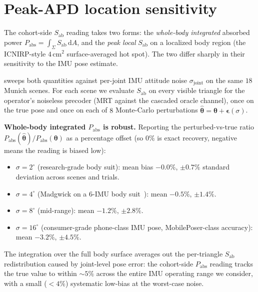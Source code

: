 \documentclass[10pt,journal,twocolumn]{IEEEtran}
\theoremstyle{plain}
\theoremstyle{definition}
\begin{document}
\section{Peak-APD location sensitivity}\label{si:peak-apd}

The cohort-side $S_\mathrm{ab}$ reading takes two forms: the
\emph{whole-body integrated} absorbed power $P_\mathrm{abs}
= \int_\Sigma S_\mathrm{ab}\,\mathrm{d}A$, and the \emph{peak local}
$S_\mathrm{ab}$ on a localized body region (the ICNIRP-style
$4\,$cm$^2$ surface-averaged hot spot). The two differ sharply in
their sensitivity to the IMU pose estimate.

 sweeps both quantities against per-joint
IMU attitude noise $\sigma_\mathrm{joint}$ on the same $18$
Munich scenes. For each scene we evaluate $S_\mathrm{ab}$ on
every visible triangle for the operator's noiseless precoder
(MRT against the cascaded oracle channel), once on the true
pose and once on each of $8$ Monte-Carlo perturbations
$\hat{\bm{\theta}} = \bm{\theta} + \bm{\epsilon}(\sigma)$.

\textbf{Whole-body integrated $P_\mathrm{abs}$ is robust.}
Reporting the perturbed-vs-true ratio
$P_\mathrm{abs}(\hat{\bm{\theta}}) / P_\mathrm{abs}(\bm{\theta})$
as a percentage offset (so $0\%$ is exact recovery, negative
means the reading is biased low):
\begin{itemize}
  \item $\sigma = 2^{\circ}$ (research-grade body suit): mean
    bias $-0.0\%$, $\pm 0.7\%$ standard deviation across
    scenes and trials.
  \item $\sigma = 4^{\circ}$ (Madgwick on a 6-IMU body
    suit~\cite{Madgwick2011}): mean $-0.5\%$, $\pm 1.4\%$.
  \item $\sigma = 8^{\circ}$ (mid-range): mean $-1.2\%$,
    $\pm 2.8\%$.
  \item $\sigma = 16^{\circ}$ (consumer-grade phone-class IMU
    pose, MobilePoser-class accuracy): mean $-3.2\%$,
    $\pm 4.5\%$.
\end{itemize}
The integration over the full body surface averages out the
per-triangle $S_\mathrm{ab}$ redistribution caused by
joint-level pose error: the cohort-side $P_\mathrm{abs}$
reading tracks the true value to within ${\sim}5\%$ across
the entire IMU operating range we consider, with a small
($<4\%$) systematic low-bias at the worst-case noise.
\end{document}
